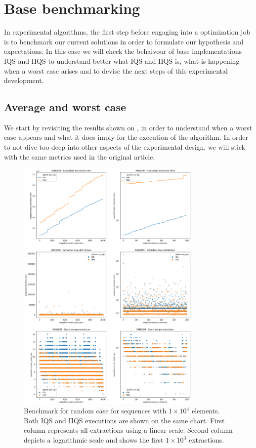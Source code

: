 \section{Base benchmarking}
In experimental algorithms, the first step before engaging into a optimization job is to benchmark our current solutions in order to formulate our hypothesis and expectations. In this case we will check the behaivour of base implementations IQS and IIQS to understand better what IQS and IIQS is, what is happening when a worst case arises and to devise the next steps of this experimental development.

\subsection{Average and worst case}

We start by revisiting the results shown on \cite{7416566}, in order to understand when a worst case appears and what it does imply for the execution of the algorithm. In order to not dive too deep into other aspects of the experimental design, we will stick with the same metrics used in the original article.

\begin{figure}[!ht]
    \centering
    \includegraphics[width=0.8\textwidth]{./fragments/04_experimental_execution/images/01_basebenchmark_01_random_case.png}
    \caption{Benchmark for random case for sequences with $1\times10^4$ elements. Both IQS and IIQS executions are shown on the same chart. First column represents all extractions using a linear scale. Second column depicts a logarithmic scale and shows the first $1\times10^3$ extractions.}
    \label{FIG:BENCHMARK_01_RANDOM_CASE}
\end{figure}


